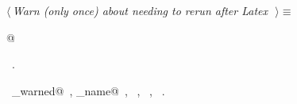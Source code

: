 \documentclass{report}
\begin{document}
\begin{flushleft} \small
\begin{minipage}{\linewidth} \label{scrap153}
$\langle\,${\it Warn (only once) about needing to rerun after Latex}\nobreak\ {\footnotesize {}}$\,\rangle\equiv$
\vspace{-1ex}
\begin{list}{}{} \item
\mbox{}@{\NWsep}
\end{list}
\vspace{-1ex}
\footnotesize\addtolength{\baselineskip}{-1ex}
\begin{list}{}{\setlength{\itemsep}{-\parsep}\setlength{\itemindent}{-\leftmargin}}
\item \NWtxtMacroRefIn\ .
\end{list}
\vspace{-2ex}
\footnotesize\addtolength{\baselineskip}{-1ex}
\begin{list}{}{\setlength{\itemsep}{-\parsep}\setlength{\itemindent}{-\leftmargin}}
\item \NWtxtIdentsUsed\nobreak\  \verb@already_warned@\nobreak\ , \verb@command_name@\nobreak\ , \verb@fprintf@\nobreak\ , \verb@stderr@\nobreak\ , \verb@TRUE@\nobreak\ .\end{list}
\end{minipage}\\[4ex]
\end{flushleft}
\end{document}
